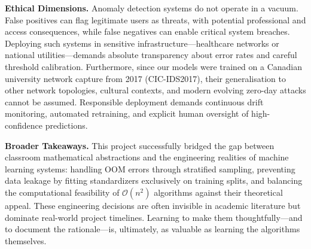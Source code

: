 \textbf{Ethical Dimensions.}
Anomaly detection systems do not operate in a vacuum. False positives can flag legitimate users as threats, with potential professional and access consequences, while false negatives can enable critical system breaches. Deploying such systems in sensitive infrastructure—healthcare networks or national utilities—demands absolute transparency about error rates and careful threshold calibration. Furthermore, since our models were trained on a Canadian university network capture from 2017 (CIC-IDS2017), their generalisation to other network topologies, cultural contexts, and modern evolving zero-day attacks cannot be assumed. Responsible deployment demands continuous drift monitoring, automated retraining, and explicit human oversight of high-confidence predictions.

\textbf{Broader Takeaways.}
This project successfully bridged the gap between classroom mathematical abstractions and the engineering realities of machine learning systems: handling OOM errors through stratified sampling, preventing data leakage by fitting standardizers exclusively on training splits, and balancing the computational feasibility of $\mathcal{O}(n^2)$ algorithms against their theoretical appeal. These engineering decisions are often invisible in academic literature but dominate real-world project timelines. Learning to make them thoughtfully—and to document the rationale—is, ultimately, as valuable as learning the algorithms themselves.
